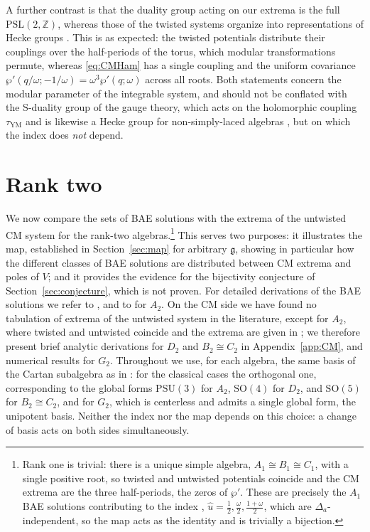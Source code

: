 \documentclass[aps, prx, nofootinbib, twocolumn,amsfonts,amsmath,amssymb,mathtools,superscriptaddress,preprintnumbers,floatfix,reprint]{revtex4-2}
\newcommand{\alg}{\mathfrak{g}}
\begin{document}
A further contrast is that the duality group acting on our extrema is the full
$\mathrm{PSL}(2,\mathbb{Z})$, whereas those of the twisted systems organize into
representations of Hecke groups \cite{Bourget:2015cza}. This is as expected: the
twisted potentials distribute their couplings over the half-periods of the
torus, which modular transformations permute, whereas \eqref{eq:CMHam} has a
single coupling and the uniform covariance
$\wp'(q/\omega;-1/\omega)=\omega^3\wp'(q;\omega)$ across all roots. Both
statements concern the modular parameter of the integrable system, and should
not be conflated with the S-duality group of the gauge theory, which acts on the
holomorphic coupling $\tau_{\mathrm{YM}}$ and is likewise a Hecke group for
non-simply-laced algebras \cite{Argyres:2006qr}, but on which the index does
\emph{not} depend.

\section{Rank two}
\label{sec:evidence}

We now compare the sets of BAE solutions with the extrema of the untwisted CM
system for the rank-two algebras.\footnote{Rank one is trivial: there is a unique simple algebra, $A_1\cong B_1\cong C_1$,
with a single positive root, so twisted and untwisted potentials coincide and
the CM extrema are the three half-periods, the zeros of $\wp'$. These are
precisely the $A_1$ BAE solutions contributing to the index \cite{ArabiArdehali:2019orz,Benini:2021ano,Lezcano:2021qbj}, $\hat u=\tfrac12,\tfrac\omega2,\tfrac{1+\omega}{2}$, which are $\Delta_a$-independent, so the map acts as the identity and is trivially a bijection.} This serves two purposes: it illustrates the
map, established in Section~\ref{sec:map} for arbitrary $\alg$, showing in particular
how the different classes of BAE solutions are distributed between CM extrema
and poles of $V$; and it provides the evidence for the bijectivity conjecture of
Section~\ref{sec:conjecture}, which is not proven. For detailed derivations of the BAE
solutions we refer to \cite{B2paper}, and to
\cite{Benini:2021ano,Lezcano:2021qbj} for $A_2$. On the CM side we have found no
tabulation of extrema of the untwisted system in the literature, except for
$A_2$, where twisted and untwisted coincide and the extrema are given in
\cite{Bourget:2015upj}; we therefore present brief analytic derivations for
$D_2$ and $B_2\cong C_2$ in Appendix~\ref{app:CM}, and numerical results for $G_2$. Throughout we use, for each algebra, the same basis of the Cartan subalgebra as
in \cite{B2paper}: for the classical cases the orthogonal one, corresponding to the global forms
$\mathrm{PSU}(3)$ for $A_2$, $\mathrm{SO}(4)$ for $D_2$, and $\mathrm{SO}(5)$
for $B_2\cong C_2$, and for $G_2$, which is centerless and admits a single global
form, the unipotent basis. Neither the index nor the map depends on this
choice: a change of basis acts on both sides simultaneously.
\end{document}
